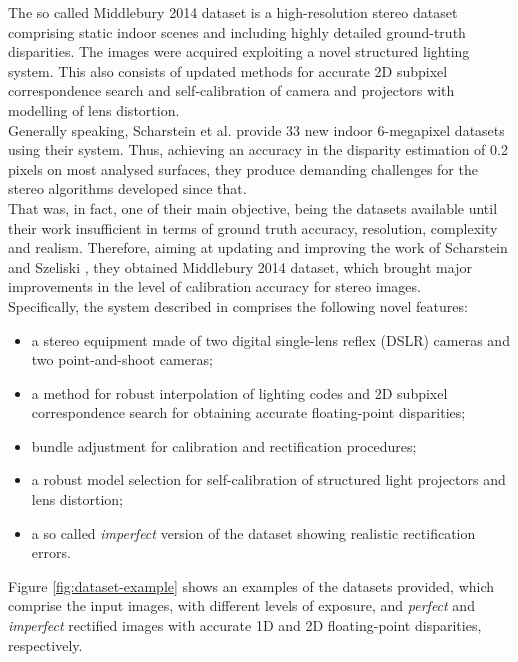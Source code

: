 The so called Middlebury 2014 dataset is a high-resolution stereo dataset comprising static indoor scenes and including highly detailed ground-truth disparities.
The images were acquired exploiting a novel structured lighting system.
This also consists of updated methods for accurate 2D subpixel correspondence search and self-calibration of camera and projectors with modelling of lens distortion.\\
Generally speaking, Scharstein et al. \cite{Scharstein2014} provide 33 new indoor 6-megapixel datasets using their system. 
Thus, achieving an accuracy in the disparity estimation of 0.2 pixels on most analysed surfaces, they produce demanding challenges for the stereo algorithms developed since that.\\
That was, in fact, one of their main objective, being the datasets available until their work insufficient in terms of ground truth accuracy, resolution, complexity and realism. 
Therefore, aiming at updating and improving the work of Scharstein and Szeliski \cite{scharstein2003high}, they obtained Middlebury 2014 dataset, which brought major improvements in the level of calibration accuracy for stereo images.\\
Specifically, the system described in \cite{Scharstein2014} comprises the following novel features: 
\begin{itemize}
	\item a stereo equipment made of two digital single-lens reflex (DSLR) cameras and two point-and-shoot cameras;
	\item a method for robust interpolation of lighting codes and 2D subpixel correspondence search for obtaining accurate floating-point disparities;
	\item bundle adjustment for calibration and rectification procedures;
	\item a robust model selection for self-calibration of structured light projectors and lens distortion;
	\item a so called \textit{imperfect} version of the dataset showing realistic rectification errors.
\end{itemize}  
Figure \ref{fig:dataset-example} shows an examples of the datasets provided, which comprise the input images, with different levels of exposure, and \textit{perfect} and \textit{imperfect} rectified images with accurate 1D and 2D floating-point disparities, respectively. 
 
